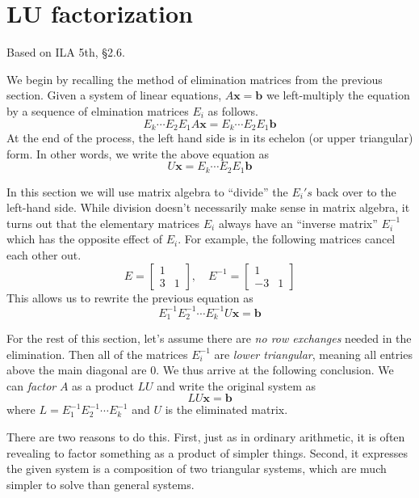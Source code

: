 \documentclass[11pt,oneside]{amsbook}
\theoremstyle{definition}
\theoremstyle{plain}
\theoremstyle{definition}
\theoremstyle{remark}
\numberwithin{equation}{section}
\numberwithin{figure}{section}
\begin{document}
\newpage
\section{LU factorization}

Based on ILA 5th, \S 2.6.

We begin by recalling the method of elimination matrices from the previous section. Given a system of linear equations, $A\bm{x}=\bm{b}$ we left-multiply the equation by a sequence of elmination matrices $E_i$ as follows.
\[E_k\cdots E_2E_1A\bm{x}=E_k\cdots E_2E_1\bm{b}
\]
At the end of the process, the left hand side is in its echelon (or upper triangular) form. In other words, we write the above equation as
\[U\bm{x}=E_k\cdots E_2E_1\bm{b}
\]

In this section we will use matrix algebra to ``divide'' the $E_i's$ back over to the left-hand side. While division doesn't necessarily make sense in matrix algebra, it turns out that the elementary matrices $E_i$ always have an ``inverse matrix'' $E_i^{-1}$ which has the opposite effect of $E_i$. For example, the following matrices cancel each other out.
\[E=\begin{bmatrix}1\\3&1\end{bmatrix},\quad
  E^{-1}=\begin{bmatrix}1\\-3&1\end{bmatrix}
\]
This allows us to rewrite the previous equation as
\[E_1^{-1}E_2^{-1}\cdots E_k^{-1}U\bm{x}=\bm{b}
\]

For the rest of this section, let's assume there are \emph{no row exchanges} needed in the elimination. Then all of the matrices $E_i^{-1}$ are \emph{lower triangular}, meaning all entries above the main diagonal are $0$. We thus arrive at the following conclusion. We can \emph{factor} $A$ as a product $LU$ and write the original system as
\[LU\bm{x}=\bm{b}
\]
where $L=E_1^{-1}E_2^{-1}\cdots E_k^{-1}$ and $U$ is the eliminated matrix.

There are two reasons to do this. First, just as in ordinary arithmetic, it is often revealing to factor something as a product of simpler things. Second, it expresses the given system is a composition of two triangular systems, which are much simpler to solve than general systems.
\end{document}
